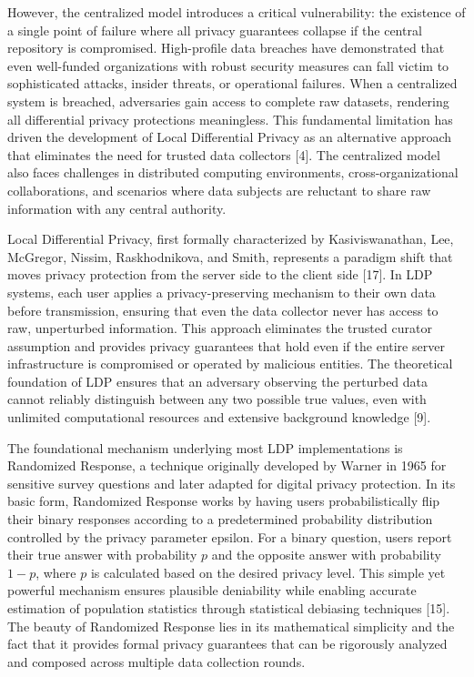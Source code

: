 \documentclass[conference]{IEEEtran}
\begin{document}
However, the centralized model introduces a critical vulnerability: the existence of a single point of failure where all privacy guarantees collapse if the central repository is compromised. High-profile data breaches have demonstrated that even well-funded organizations with robust security measures can fall victim to sophisticated attacks, insider threats, or operational failures. When a centralized system is breached, adversaries gain access to complete raw datasets, rendering all differential privacy protections meaningless. This fundamental limitation has driven the development of Local Differential Privacy as an alternative approach that eliminates the need for trusted data collectors [4]. The centralized model also faces challenges in distributed computing environments, cross-organizational collaborations, and scenarios where data subjects are reluctant to share raw information with any central authority.

Local Differential Privacy, first formally characterized by Kasiviswanathan, Lee, McGregor, Nissim, Raskhodnikova, and Smith, represents a paradigm shift that moves privacy protection from the server side to the client side [17]. In LDP systems, each user applies a privacy-preserving mechanism to their own data before transmission, ensuring that even the data collector never has access to raw, unperturbed information. This approach eliminates the trusted curator assumption and provides privacy guarantees that hold even if the entire server infrastructure is compromised or operated by malicious entities. The theoretical foundation of LDP ensures that an adversary observing the perturbed data cannot reliably distinguish between any two possible true values, even with unlimited computational resources and extensive background knowledge [9].

The foundational mechanism underlying most LDP implementations is Randomized Response, a technique originally developed by Warner in 1965 for sensitive survey questions and later adapted for digital privacy protection. In its basic form, Randomized Response works by having users probabilistically flip their binary responses according to a predetermined probability distribution controlled by the privacy parameter epsilon. For a binary question, users report their true answer with probability $p$ and the opposite answer with probability $1-p$, where $p$ is calculated based on the desired privacy level. This simple yet powerful mechanism ensures plausible deniability while enabling accurate estimation of population statistics through statistical debiasing techniques [15]. The beauty of Randomized Response lies in its mathematical simplicity and the fact that it provides formal privacy guarantees that can be rigorously analyzed and composed across multiple data collection rounds.
\end{document}
